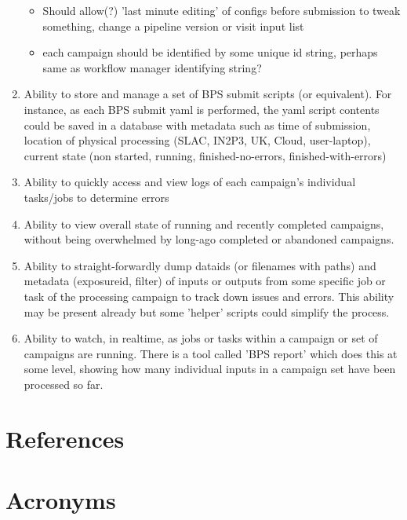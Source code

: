 \documentclass[DM,authoryear,toc]{lsstdoc}
\begin{document}
\begin{enumerate}
\begin{itemize}
	\item  Should allow(?) 'last minute editing' of configs before
	submission to tweak something, change a pipeline version or
	visit input list

	\item each campaign should be identified by some unique id string, 
	perhaps same as workflow manager identifying string?

	\end{itemize}

	\item Ability to store and manage a set of BPS submit scripts 
	(or equivalent).
	For instance, as each BPS submit yaml is performed, the yaml
	script contents could be saved in a database with metadata such
	as time of submission, location of physical processing
	(SLAC, IN2P3, UK, Cloud, user-laptop), current state (non started,
	running, finished-no-errors, finished-with-errors)


	\item Ability to quickly access and view logs of each 
	campaign's individual tasks/jobs to determine errors

	\item Ability to view overall state of running and recently
	completed campaigns, without being overwhelmed by long-ago completed
	or abandoned campaigns.

	\item Ability to straight-forwardly dump dataids (or filenames
	with paths) and metadata (exposureid, filter) of inputs or outputs
	from some specific job or task of the processing campaign to
	track down issues and errors.  This ability may be present already
	but some 'helper' scripts could simplify the process.

	\item Ability to watch, in realtime, as jobs or tasks within
	a campaign or set of campaigns are running.  There is a tool	
	called 'BPS report' which does this at some level, showing how
	many individual inputs in a campaign set have been processed
	so far.

	\end {enumerate}

\appendix
\section{References} \label{sec:bib}
\renewcommand{\refname}{} %


\section{Acronyms} \label{sec:acronyms}

\end{document}
